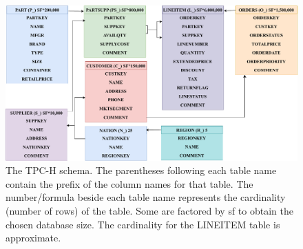\begin{figure}[hbt!]
\centering
\includegraphics[width=1.0\linewidth]{img/TPCH.pdf}
\caption[The TPC-H schema]{The TPC-H schema. The parentheses following each table name contain the prefix of the column names for that table. The number/formula beside each table name represents the cardinality (number of rows) of the table. Some are factored by \acrshort{sf} to obtain the chosen database size. The cardinality for the LINEITEM table is approximate.~\cite{noauthor_tpc-homepage_2024}}
\label{fig:tpch-schema}
\end{figure}